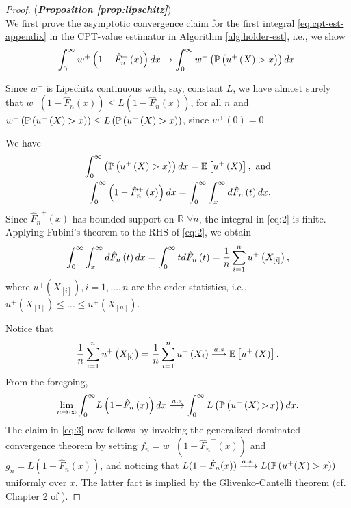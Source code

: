 \begin{proof}(\textbf{\textit{Proposition \ref{prop:lipschitz}}})\ \\
We first prove the asymptotic convergence claim for the first integral  \eqref{eq:cpt-est-appendix} in the CPT-value estimator in Algorithm \ref{alg:holder-est}, i.e., we show
\begin{align}
\int_0^{\infty} w^+\left(1-{\hat F_n}^+\left(x\right)\right)  dx \rightarrow \int_0^{\infty} w^+\left(\mathbb{P}\left( u^+\left(X\right)>x \right)\right) dx.\label{eq:3}
\end{align} 

Since $w^+$ is Lipschitz continuous with, say, constant $L$, we have almost surely that
$w^{+}\left(1-\hat{F}_n\left(x\right)\right) \leq L \left(1-\hat{F}_n\left(x\right)\right)$,  
for all $n$ and 
 $w^{+}\left(\mathbb{P}\left( u^+\left(X\right)>x \right)\right) \leq L \left(\mathbb{P}\left( u^+\left(X\right)>x \right)\right)$, since $w^+\left(0\right)=0$.
 

We have
\begin{align}
\int_0^{\infty} \left(\mathbb{P}\left( u^+\left(X\right)>x \right)\right)  dx = \mathbb{E}\left[u^+\left(X\right)\right], \text{ and} \nonumber\\
\int_0^{\infty} \left(1-{\hat F_n}^+\left(x\right)\right)  dx =\int_0^{\infty} \int_x^\infty d \hat{F}_n\left(t\right) dx.\label{eq:2}
\end{align}
Since ${\hat F_n}^+\left(x\right)$ has bounded support on $\mathbb{R}$ $\forall n$, the integral in \eqref{eq:2} is finite.
Applying Fubini's theorem to the RHS of \eqref{eq:2}, we obtain
\begin{align*}
\intinfinity \int_x^\infty d \hat{F}_n\left(t\right) dx %
= \intinfinity t d\hat{F}_n\left(t\right) = \frac{1}{n} \sum_{i=1}^n u^+\left(X_{[i]}\right),
 \end{align*}
 where $u^+\left(X_{[i]}\right), i=1,\ldots,n$ are the order statistics, i.e., $u^+\left(X_{[1]}\right) \le \ldots \le u^+\left(X_{[n]}\right)$.
 
Notice that 
\begin{align*}
\frac{1}{n}
\sum_{i=1}^n u^+\left(X_{[i]}\right)
=
\frac{1}{n}
\sum_{i=1}^n u^+\left(X_{i}\right)
\overset{a.s}\longrightarrow 
\mathbb{E}\left[u^+\left(X\right)\right].
\end{align*}
From the foregoing,
\begin{align*}
\lim_{n\rightarrow \infty} \int_0^{\infty} \!L\left(1\!-\!\hat{F}_n\left(x\right)\right) dx
\overset{a.s} \longrightarrow
\int_0^{\infty} L \left(\mathbb{P}\left( u^+\left(X\right)\!>\!x \right)\right) dx.
\end{align*}
The claim in \eqref{eq:3} now follows by invoking the generalized dominated convergence theorem by setting $f_n = w^+(1-{\hat F_n}^+(x))$ and $g_n = L(1-\hat{F}_n(x))$, and noticing that $L(1-\hat{F}_n(x)) \xrightarrow{a.s.} L(\mathbb{P}\left( u^+(X)>x \right))$ uniformly over $x$. The latter fact is implied by the Glivenko-Cantelli theorem (cf. Chapter 2 of \cite{wasserman2006}).


\end{proof}
